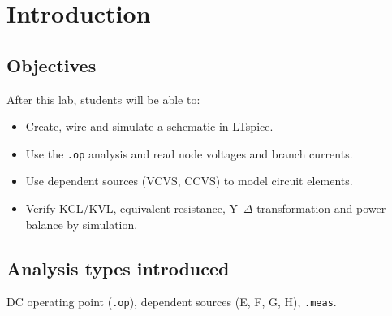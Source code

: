 \section{Introduction}


\subsection{Objectives}
After this lab, students will be able to:
\begin{itemize}[itemsep=2pt]
  \item Create, wire and simulate a schematic in LTspice.
  \item Use the \texttt{.op} analysis and read node voltages and branch currents.
  \item Use dependent sources (VCVS, CCVS) to model circuit elements.
  \item Verify KCL/KVL, equivalent resistance, Y--$\Delta$ transformation and power balance by simulation.
\end{itemize}

\subsection{Analysis types introduced}
DC operating point (\texttt{.op}), dependent sources (E, F, G, H), \texttt{.meas}.
